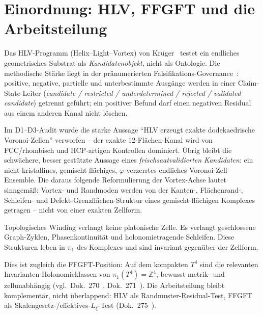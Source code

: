 \section{Einordnung: HLV, FFGFT und die Arbeitsteilung}

Das HLV-Programm (Helix--Light--Vortex) von Krüger~\cite{krueger276main}
testet ein endliches geometrisches Substrat als \emph{Kandidatenobjekt}, nicht
als Ontologie. Die methodische Stärke liegt in der pränumerierten
Falsifikations-Governance~\cite{krueger276gov}: positive, negative, partielle
und unter\-bestimmte Ausgänge werden in einer Claim-State-Leiter
(\emph{candidate / restricted / underdetermined / rejected / validated
candidate}) getrennt geführt; ein positiver Befund darf einen negativen
Residual aus einem anderen Kanal nicht löschen.

Im D1--D3-Audit wurde die starke Aussage ``HLV erzeugt exakte dodekaedrische
Voronoi-Zellen'' verworfen -- der exakte 12-Flächen-Kanal wird von FCC/rhombisch
und HCP-artigen Kontrollen dominiert. Übrig bleibt die schwächere, besser
gestützte Aussage eines \emph{frischsaatvalidierten Kandidaten}: ein
nicht-kristallines, gemischt-flächiges, $\varphi$-verzerrtes endliches
Voronoi-Zell-Ensemble. Die daraus folgende Reformulierung der Vortex-Achse
lautet sinngemäß: Vortex- und Randmoden werden von der Kanten-, Flächenrand-,
Schleifen- und Defekt-Grenzflächen-Struktur eines gemischt-flächigen Komplexes
getragen -- nicht von einer exakten Zellform.

\begin{beobachtung*}
Topologisches Winding verlangt keine platonische Zelle. Es verlangt
geschlossene Graph-Zyklen, Phasenkontinuität und holonomietragende Schleifen.
Diese Strukturen leben in $\pi_1$ des Komplexes und sind invariant gegenüber
der Zellform.
\end{beobachtung*}

Dies ist zugleich die FFGFT-Position: Auf dem kompakten $T^4$ sind die
relevanten Invarianten Holonomieklassen von $\pi_1(T^4)=\mathbb{Z}^4$, bewusst
metrik- und zellunabhängig (vgl.\ Dok.~270~\cite{dok270},
Dok.~271~\cite{dok271}). Die Arbeitsteilung bleibt komplementär, nicht
überlappend: HLV als Randmuster-Residual-Test, FFGFT als
Skalengesetz-/effektives-$L_\xi$-Test (Dok.~275~\cite{dok275}).

